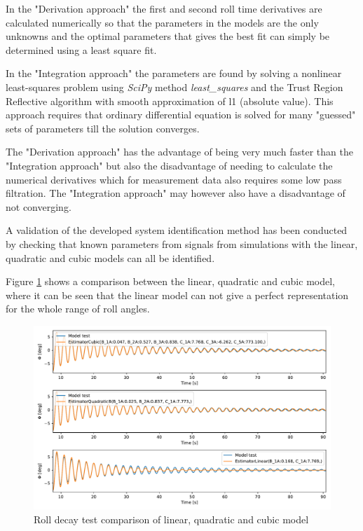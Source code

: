In the "Derivation approach" the first and second roll time derivatives are calculated numerically so that the parameters in the models are the only unknowns and the optimal parameters that gives the best fit can simply be determined using a least square fit.

In the "Integration approach" the parameters are found by solving a nonlinear least-squares problem using \emph{SciPy} method \emph{least\_squares} \cite{noauthor_scipyoptimizeleast_squares_nodate} and the Trust Region Reflective algorithm with smooth approximation of l1 (absolute value). This approach requires that ordinary differential equation is solved for many "guessed" sets of parameters till the solution converges.

The "Derivation approach" has the advantage of being very much faster than the "Integration approach" but also the disadvantage of needing to calculate the numerical derivatives which for measurement data also requires some low pass filtration. The "Integration approach" may however also have a disadvantage of not converging.

A validation of the developed system identification method has been conducted by checking that known parameters from signals from simulations with the linear, quadratic and cubic models can all be identified. 

Figure \ref{fig:roll_decay_model_compare} shows a comparison between the linear, quadratic and cubic model, where it can be seen that the linear model can not give a perfect representation for the whole range of roll angles.    

\begin{figure}[H]
    \centering
    \includegraphics[width=0.9\columnwidth]{figures/roll_decay_model_compare.pdf}
    \caption{Roll decay test comparison of linear, quadratic and cubic model}
    \label{fig:roll_decay_model_compare}
\end{figure}
